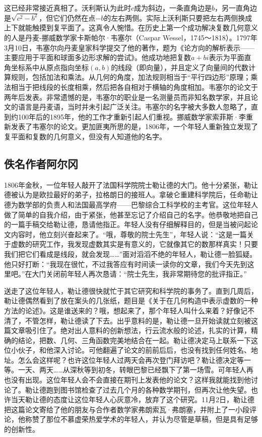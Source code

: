 \documentclass[b5paper]{ctexart}
\begin{document}
这已经非常接近真相了。沃利斯认为此时$c$成为斜边，一条直角边是$b$，另一直角边是$\sqrt{c^2 - b^2}$，但它们仍然在点$-b$的左右两侧。实际上沃利斯只要把左右两侧换成上下就能触摸到复平面了。这真令人惋惜。在历史上第一个成功解决复数几何意义的人是丹麦-挪威数学家卡斯帕尔·韦塞尔（Caspar Wessel，1745～1818）。1797年3月10日，韦塞尔向丹麦皇家科学提交了他的著作，题为《论方向的解析表示——主要应用于平面和球面多边形求解的尝试》。他成功地把复数$a + bi$表示为平面直角坐标系中从原点指向坐标$(a, b)$的线段（即向量），并且定义了向量间的代数计算规则，包括加法和乘法。从几何的角度，加法规则相当于“平行四边形”原理；乘法相当于把线段的长度相乘，然后把各自相对于横轴的角度相加。韦塞尔的论文于两年后发表。非常遗憾的是，韦塞尔的职业是一名测量员而非知名数学家，并且论文的语言是丹麦语，当时并未引起广泛关注。韦塞尔的名字被大多数人忽略了，直到约100年后的1895年，他的工作才重新引起人们重视。挪威数学家索菲斯·李重新发表了韦塞尔的论文。更加匪夷所思的是，1806年，一个年轻人重新独立发现了复平面和复数的几何意义，但没有人知道他的名字。

\subsection{佚名作者阿尔冈}
1806年金秋，一位年轻人敲开了法国科学院院士勒让德的大门。他十分紧张，勒让德被认为是欧拉最好的弟子，拉格朗日的接班人。拿破仑重建科学院后，任命勒让德为数学部的负责人和法国最高学府——巴黎综合工科学校的主考官。这位年轻人做了简单的自我介绍，由于紧张，他甚至忘记了介绍自己的名字。他恭敬地把自己的一篇手稿交给勒让德，恳请他指正。年轻人没有仔细解释目的，但是当被问起论文内容时，他立刻兴奋起来了。“哦，尊敬的院士先生”，年轻人说：“这是一篇关于虚数的研究工作，我发现虚数其实是有意义的，它就像其它的数那样真实！只要我们把它们看成是线段，就会发现……”面对滔滔不绝的年轻人，勒让德一脸狐疑。他只好打断：“我现在很忙，不过我答应有时间读一读你的文章，我们今天先到这里吧。”在大门关闭前年轻人再次恳请：“院士先生，我非常期待您的批评指正。”

送走了这位年轻人，勒让德很快就忙于其它研究和科学院的事务了。直到几周后，勒让德偶然看到了放在案头的几张纸，题目是《关于在几何构造中表示虚数的一种方法的论述》。这是谁送来的？哦，想起来了，那个年轻人叫什么来着？好像记不清了，不管怎样，勒让德读了下去。出乎意料的是，勒让德一旦开始读就立刻被这篇文章吸引住了。绝对出人意料的创新想法，行云流水般的论述，扎实的计算，精确的结论，把数、几何、三角函数完美地结合在一起。勒让德决定马上联系一下这位小伙子，和他深入讨论。可他翻遍了论文的前前后后，也没有找到任何姓名、地址。怎么会这样呢？也许这位年轻人过两天会再次登门拜访吧？勒让德决定等一等。一天、两天……从深秋等到初冬，转眼巴黎已经飘下了第一场雪。可年轻人再也没有出现。这位年轻人会不会直接在期刊上发表他的论文？这样我就能找到他讨论了。勒让德跑到图书馆检查了过去几个月的各种数学期刊，但再次让他失望。也许当天勒让德的态度让这位年轻人心灰意冷，放弃了这个研究。11月2日，勒让德把这篇论文寄给了他的朋友与合作者数学家弗朗索瓦·弗朗塞，并附上了一小段评论，他称赞了那位不慕虚荣热爱学术的年轻人，并认为尽管是草稿，但是具有足够的创新性。
\end{document}
